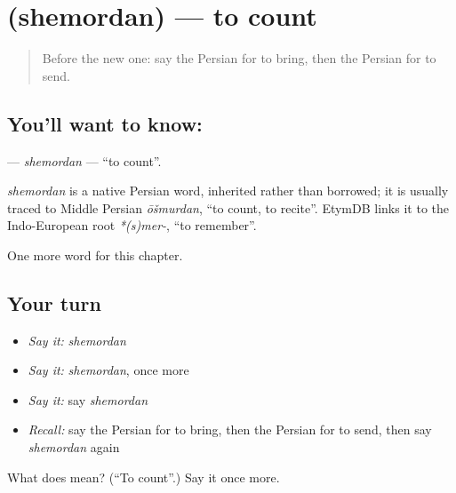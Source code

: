 \section[\texorpdfstring{\fa{شمردن} (shemordan)}{شمردن (shemordan)}]{ (shemordan) — to count}

\label{lesson:FA-C38-shemordan}



\begin{quote}
Before the new one: say the Persian for to bring, then the Persian for to send.
\end{quote}

\subsection*{You'll want to know: }
\textbf{} — \emph{shemordan} — \textquotedblleft{}to count\textquotedblright{}.

\begin{cousinweb}
\emph{shemordan} is a native Persian word, inherited rather than borrowed; it is usually traced to Middle Persian \emph{ōšmurdan}, \textquotedblleft{}to count, to recite\textquotedblright{}. EtymDB links it to the Indo-European root \emph{*(s)mer-}, \textquotedblleft{}to remember\textquotedblright{}.
\end{cousinweb}

\begin{grammarlens}[title={What you've built}]
One more word for this chapter.
\end{grammarlens}

\subsection*{Your turn}
\begin{itemize}
\raggedright
  \item \emph{Say it:} \emph{shemordan}
  \item \emph{Say it:} \emph{shemordan}, once more
  \item \emph{Say it:} say \emph{shemordan}
  \item \emph{Recall:} say the Persian for to bring, then the Persian for to send, then say \emph{shemordan} again
\end{itemize}

\begin{tcolorbox}[breakable,colback=teal!4,colframe=teal!35!black,title={Before you move on}]
What does  mean? (\textquotedblleft{}To count\textquotedblright{}.) Say it once more.
\end{tcolorbox}
